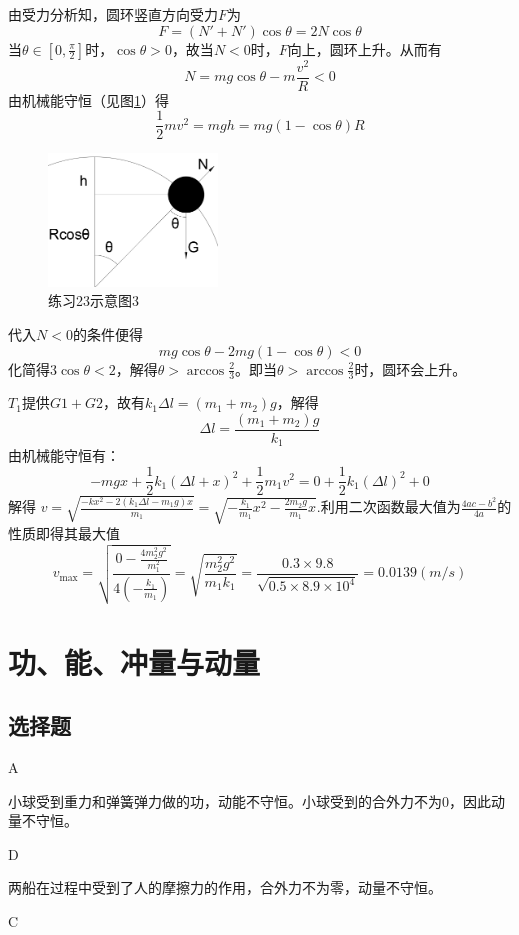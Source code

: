 \documentclass[b5paper,opensource,sourcefont,parskip]{qyxf-book}
\begin{document}
由受力分析知，圆环竖直方向受力$F$为
\[
F=(N'+N')\cos\theta=2N\cos\theta
\]
当$\theta\in[0,\frac{\pi}{2}]$时，$\cos\theta>0$，故当$N<0$时，$F$向上，圆环上升。从而有
\[N=mg\cos\theta-m\frac{v^2}{R}<0\]
由机械能守恒（见图\ref{fig:t23-3}）得
\[\frac{1}{2}mv^2=mgh=mg(1-\cos\theta)R\]

\begin{figure}[htbp]
\centering
\includegraphics[height=100pt]{Chp2_illus4.png}
\caption{练习23示意图3}\label{fig:t23-3}
\end{figure}

代入$N<0$的条件便得
\[mg\cos\theta-2mg(1-\cos\theta)<0\]
化简得$3\cos\theta<2$，解得$\theta>\arccos\frac{2}{3}$。即当$\theta>\arccos\frac{2}{3}$时，圆环会上升。

\solve $T_1$提供$G1+G2$，故有$k_1\Delta l=(m_1+m_2)g$，解得
\[\Delta l=\frac{(m_1+m_2)g}{k_1}\]
由机械能守恒有：
\[-mgx+\frac{1}{2}k_1(\Delta l+x)^2+\frac{1}{2}m_1v^2=0+\frac{1}{2}k_1(\Delta l)^2+0\]
解得
$v=\sqrt{\frac{-kx^2-2(k_1\Delta l-m_1g)x}{m_1}}=\sqrt{-\frac{k_1}{m_1}x^2-\frac{2m_2g}{m_1}x}$.利用二次函数最大值为$\frac{4ac-b^2}{4a}$的性质即得其最大值
\[
v_{\text{max}}=\sqrt{\frac{0-\frac{4m_2^2g^2}{m_1^2}}{4\left(-\frac{k_1}{m_1}\right)}}=\sqrt{\frac{m_2^2g^2}{m_1k_1}}=\frac{0.3\times 9.8}{\sqrt{0.5\times 8.9\times 10^4}}=0.0139(m/s)
\]



\chapter{功、能、冲量与动量}
\section{选择题}

A

小球受到重力和弹簧弹力做的功，动能不守恒。小球受到的合外力不为0，因此动量不守恒。

D

两船在过程中受到了人的摩擦力的作用，合外力不为零，动量不守恒。

C
\end{document}
